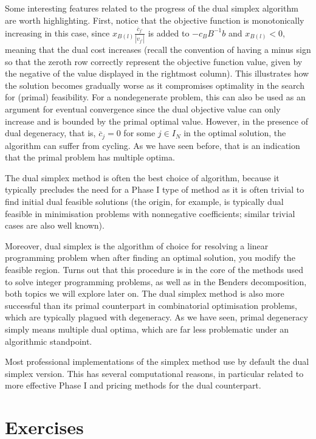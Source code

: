 Some interesting features related to the progress of the dual simplex algorithm are worth highlighting. First, notice that the objective function is monotonically increasing in this case, since $x_{B(l)}\frac{\overline{c}_{j'}}{|v_{j'}|}$ is added to $-c_BB^{-1}b$ and $x_{B(l)} < 0$, meaning that the dual cost increases (recall the convention of having a minus sign so that the zeroth row correctly represent the objective function value, given by the negative of the value displayed in the rightmost column). This illustrates how the solution becomes gradually worse as it compromises optimality in the search for (primal) feasibility. For a nondegenerate problem, this can also be used as an argument for eventual convergence since the dual objective value can only increase and is bounded by the primal optimal value. However, in the presence of dual degeneracy, that is, $\overline{c}_{j} = 0$ for some $j \in I_N$ in the optimal solution, the algorithm can suffer from cycling. As we have seen before, that is an indication that the primal problem has multiple optima. 

The dual simplex method is often the best choice of algorithm, because it typically precludes the need for a Phase I type of method as it is often trivial to find initial dual feasible solutions (the origin, for example, is typically dual feasible in minimisation problems with nonnegative coefficients; similar trivial cases are also well known).

Moreover, dual simplex is the algorithm of choice for resolving a linear programming problem when after finding an optimal solution, you modify the feasible region. Turns out that this procedure is in the core of the methods used to solve integer programming problems, as well as in the Benders decomposition, both topics we will explore later on. The dual simplex method is also more successful than its primal counterpart in combinatorial optimisation problems, which are typically plagued with degeneracy. As we have seen, primal degeneracy simply means multiple dual optima, which are far less problematic under an algorithmic standpoint.

Most professional implementations of the simplex method use by default the dual simplex version. This has several computational reasons, in particular related to more effective Phase I and pricing methods for the dual counterpart.

\vfill
\pagebreak
 
\section{Exercises}

